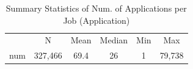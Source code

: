 \begin{table}[htbp]\centering
\def\sym#1{\ifmmode^{#1}\else\(^{#1}\)\fi}
\caption{Summary Statistics of Num. of Applications per Job  (Application)}
\begin{tabular}{l*{1}{ccccc}}
\toprule
                    &           N&        Mean&      Median&         Min&         Max\\
\label{tab:appappnum}
num                 &     327,466&        69.4&          26&           1&      79,738\\
\bottomrule
\end{tabular}
\end{table}
